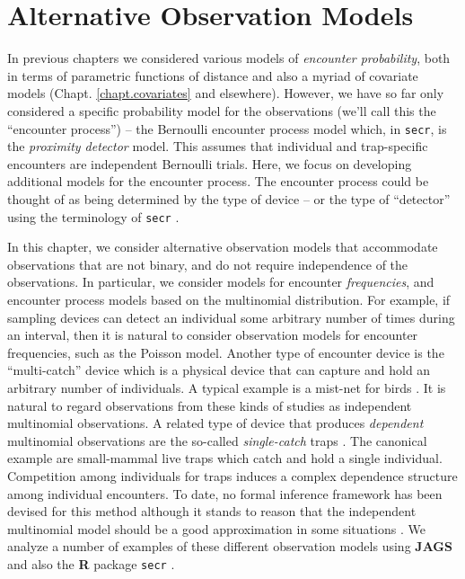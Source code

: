 \chapter{Alternative Observation Models}
\label{chapt.poisson-mn}

\vspace{.3in}



In previous chapters we considered 
various models of {\it encounter probability}, both in terms of
parametric functions of distance and also a myriad of covariate
models (Chapt. \ref{chapt.covariates} and
elsewhere).
However, we have so far only considered
a specific probability model for the observations (we'll call this the
``encounter process'') --
the Bernoulli encounter process model which, in \mbox{\tt secr}, is
the {\it proximity detector} model. This assumes that individual and
trap-specific encounters are independent Bernoulli trials.  Here, we
focus on developing additional models for the encounter process.  The
encounter process could be thought of as being determined by the type
of device -- or the type of ``detector'' using the terminology of
\mbox{\tt secr} \citep{efford:2011}.

In this chapter, we consider alternative observation models 
 that accommodate observations that are not binary, and do not
require independence of the observations. 
In particular, we consider models for
encounter {\it frequencies}, and encounter process models based on the
multinomial distribution. For example, if sampling devices can detect
an individual some arbitrary number of times during an interval, then
it is natural to consider observation models for encounter
frequencies, such as the Poisson model. Another type of encounter
device is the ``multi-catch'' device \citep{efford_etal:2009euring}
which is a physical device that can capture and hold an arbitrary
number of individuals. A typical example is a mist-net for birds
\citep{borchers_efford:2008}.  It is natural to regard observations
from these kinds of studies as independent multinomial observations.
A related type of device that produces {\it dependent} multinomial
observations are the so-called {\it single-catch} traps
\citep{efford:2004, efford_etal:2009euring}. The canonical example are
small-mammal live traps  which catch and
hold a single individual. Competition among individuals for traps
induces a complex dependence structure among individual encounters. To
date, no formal inference framework has been devised for this method
although it stands to reason that the independent multinomial model
should be a good approximation in some situations
\citep{efford_etal:2009euring}.
We analyze a number of examples of these different observation models
using {\bf JAGS} and also the {\bf R}
package \mbox{\tt secr} \citep{efford:2011}.




